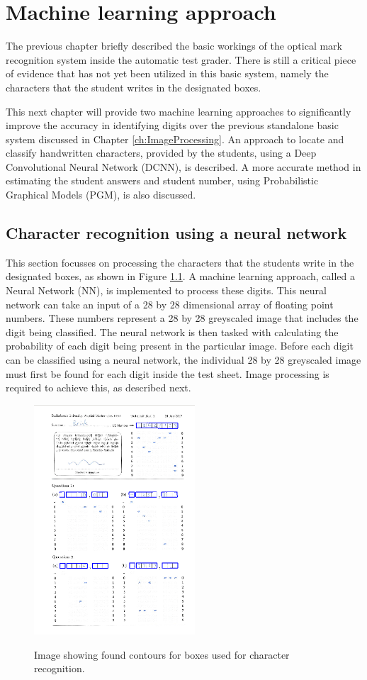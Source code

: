 \chapter{Machine learning approach}
\label{ch:MachineLearning}
\graphicspath{{Chapter4/Chapter4Figures/}}

The previous chapter briefly described the basic workings of the optical mark recognition system inside the automatic test grader. There is still a critical piece of evidence that has not yet been utilized in this basic system, namely the characters that the student writes in the designated boxes.

This next chapter will provide two machine learning approaches to significantly improve the accuracy in identifying digits over the previous standalone basic system discussed in Chapter \ref{ch:ImageProcessing}. An approach to locate and classify handwritten characters, provided by the students, using a Deep Convolutional Neural Network (DCNN), is described. A more accurate method in estimating the  student answers and student number, using Probabilistic  Graphical Models (PGM), is also discussed. 

\section{Character recognition using a neural network}

This section focusses on processing the characters that the students write in the designated boxes, as shown in Figure \ref{fig:sa}. A machine learning approach, called a Neural Network (NN), is implemented to process these digits. This neural network can take an input of a 28 by 28 dimensional array of floating point numbers. These numbers represent a 28 by 28 greyscaled image that includes the digit being classified. The neural network is then tasked with calculating the probability of each digit being present in the particular image. Before each digit can be classified using a neural network, the individual 28 by 28 greyscaled image must first be found for each digit inside the test sheet. Image processing is required to achieve this, as described next.
\begin{figure}
  \centering
  \includegraphics[width=6cm]{DigitScan}\\
  \caption{Image showing found contours for boxes used for character recognition.}
  \label{fig:sa}
\end{figure}

